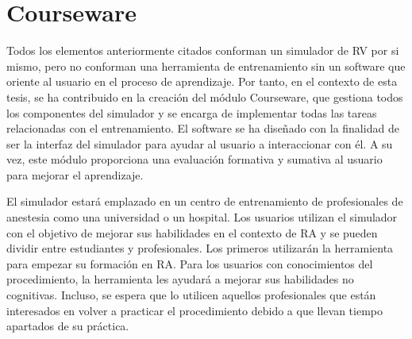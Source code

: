 \section{Courseware}
\label{rasim:courseware}
Todos los elementos anteriormente citados conforman un simulador de \ac{RV} por si mismo, pero no conforman una herramienta de entrenamiento sin un software que oriente al usuario en el proceso de aprendizaje. Por tanto, en el contexto de esta tesis, se ha contribuido en la creación del módulo \ac{Courseware}, que gestiona todos los componentes del simulador y se encarga de implementar todas las tareas  relacionadas con el entrenamiento. El software se ha diseñado con la finalidad de ser la interfaz del simulador para ayudar al usuario a interaccionar con él. A su vez, este módulo proporciona una evaluación formativa y sumativa al usuario\del{,} para mejorar el aprendizaje.





El simulador estará emplazado en un centro de entrenamiento de profesionales de anestesia como una universidad o un hospital. Los usuarios utilizan el simulador con el objetivo de mejorar sus habilidades en el contexto de \ac{RA} y se pueden dividir entre estudiantes y profesionales. Los primeros utilizarán la herramienta para empezar su formación en \ac{RA}. Para los usuarios con conocimientos del procedimiento, la herramienta les ayudará a mejorar sus habilidades no cognitivas. Incluso, se espera que lo utilicen aquellos profesionales que están interesados en volver a practicar el procedimiento debido a que llevan tiempo apartados de su práctica.


